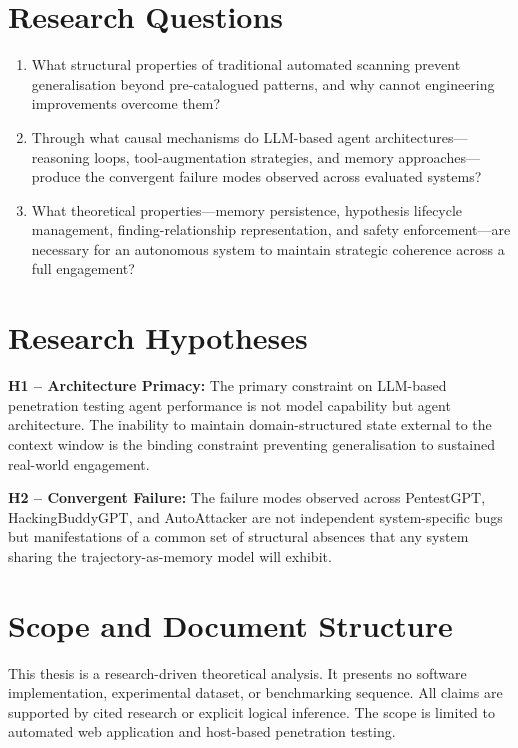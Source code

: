 \documentclass[12pt,a4paper,oneside,openany]{book}
\begin{document}
\section{Research Questions}

\begin{enumerate}[leftmargin=*,topsep=2pt,itemsep=1pt]
\item[\textbf{RQ1}] What structural properties of traditional automated scanning prevent generalisation beyond pre-catalogued patterns, and why cannot engineering improvements overcome them?
\item[\textbf{RQ2}] Through what causal mechanisms do LLM-based agent architectures---reasoning loops, tool-augmentation strategies, and memory approaches---produce the convergent failure modes observed across evaluated systems?
\item[\textbf{RQ3}] What theoretical properties---memory persistence, hypothesis lifecycle management, finding-relationship representation, and safety enforcement---are necessary for an autonomous system to maintain strategic coherence across a full engagement?
\end{enumerate}

\section{Research Hypotheses}

\textbf{H1 -- Architecture Primacy:} The primary constraint on LLM-based penetration testing agent performance is not model capability but agent architecture. The inability to maintain domain-structured state external to the context window is the binding constraint preventing generalisation to sustained real-world engagement.

\textbf{H2 -- Convergent Failure:} The failure modes observed across PentestGPT, HackingBuddyGPT, and AutoAttacker are not independent system-specific bugs but manifestations of a common set of structural absences that any system sharing the trajectory-as-memory model will exhibit.

\section{Scope and Document Structure}

This thesis is a research-driven theoretical analysis. It presents no software implementation, experimental dataset, or benchmarking sequence. All claims are supported by cited research or explicit logical inference. The scope is limited to automated web application and host-based penetration testing.
\end{document}
